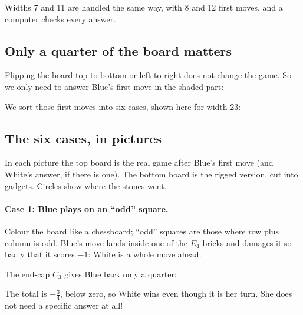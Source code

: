 \documentclass[11pt]{article}
\begin{document}
\begin{center}
\end{center}

Widths 7 and 11 are handled the same way, with 8 and 12 first moves, and a
computer checks every answer.

\subsection{Only a quarter of the board matters}

Flipping the board top-to-bottom or left-to-right does not change the game.
So we only need to answer Blue's first move in the shaded part:

\begin{center}
\end{center}

We sort those first moves into six cases, shown here for width 23:

\begin{center}
\end{center}

\subsection{The six cases, in pictures}

In each picture the top board is the real game after Blue's first move (and
White's answer, if there is one). The bottom board is the rigged version, cut
into gadgets. Circles show where the stones went.

\paragraph{Case 1: Blue plays on an ``odd'' square.}
Colour the board like a chessboard; ``odd'' squares are those where row plus
column is odd. Blue's move lands inside one of the $E_4$ bricks and damages it
so badly that it scores $-1$: White is a whole move ahead.

\begin{center}
\qquad
{}
\end{center}

The end-cap $C_3$ gives Blue back only a quarter:

\begin{center}
\end{center}

The total is $-\frac34$, below zero, so White wins even though it is her turn.
She does not need a specific answer at all!
\end{document}

